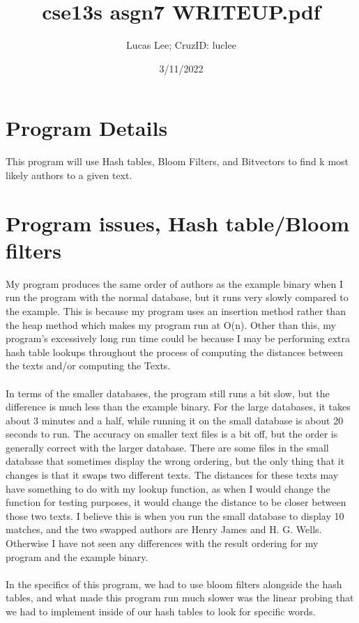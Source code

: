 \documentclass[11pt]{article}
\title{cse13s asgn7 WRITEUP.pdf}
\author{Lucas Lee; CruzID: luclee}
\date{3/11/2022}
\begin{document}
\maketitle

\section{Program Details}\label{ss:details}
This program will use Hash tables, Bloom Filters, and Bitvectors to find k most likely authors to a given text. 

\section{Program issues, Hash table/Bloom filters}\label{ss:issues}
My program produces the same order of authors as the example binary when I run the program with the normal database, but it runs very slowly compared to the example. This is because my program uses an insertion method rather than the heap method which makes my program run at O(n). Other than this, my program's excessively long run time could be because I may be performing extra hash table lookups throughout the process of computing the distances between the texts and/or computing the Texts. \\
\\
In terms of the smaller databases, the program still runs a bit slow, but the difference is much less than the example binary. For the large databases, it takes about 3 minutes and a half, while running it on the small database is about 20 seconds to run. The accuracy on smaller text files is a bit off, but the order is generally correct with the larger database. There are some files in the small database that sometimes display the wrong ordering, but the only thing that it changes is that it swaps two different texts. The distances for these texts may have something to do with my lookup function, as when I would change the function for testing purposes, it would change the distance to be closer between those two texts. I believe this is when you run the small database to display 10 matches, and the two swapped authors are Henry James and H. G. Wells. Otherwise I have not seen any differences with the result ordering for my program and the example binary.
\\ \\
In the specifics of this program, we had to use bloom filters alongside the hash tables, and what made this program run much slower was the linear probing that we had to implement inside of our hash tables to look for specific words. 
\end{document}
